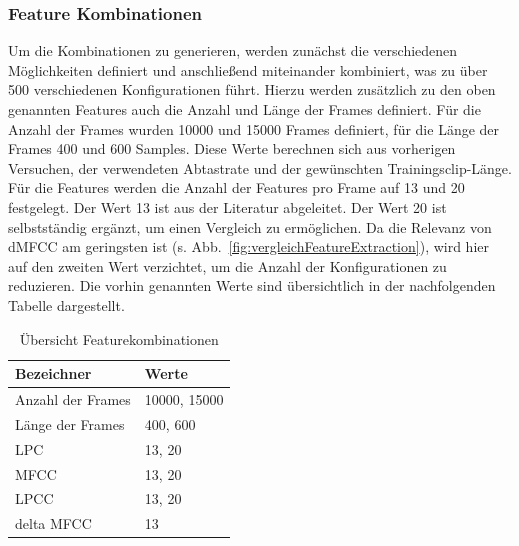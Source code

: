 \subsubsection{Feature Kombinationen}\label{sec:FeatureKombination}

Um die Kombinationen zu generieren, werden zunächst die verschiedenen Möglichkeiten definiert und anschließend miteinander kombiniert, was zu über 500 verschiedenen Konfigurationen führt.
Hierzu werden zusätzlich zu den oben genannten Features auch die Anzahl und Länge der Frames definiert.
Für die Anzahl der Frames wurden 10000 und 15000 Frames definiert, für die Länge der Frames 400 und 600 Samples.
Diese Werte berechnen sich aus vorherigen Versuchen, der verwendeten Abtastrate und der gewünschten Trainingsclip-Länge.
Für die Features werden die Anzahl der Features pro Frame auf 13 und 20 festgelegt.
Der Wert 13 ist aus der Literatur abgeleitet. \autocite[vgl.][S. 69]{valerio_velardo_mel-frequency_2020}
Der Wert 20 ist selbstständig ergänzt, um einen Vergleich zu ermöglichen.
Da die Relevanz von \ac{dMFCC} am geringsten ist (s. Abb.~\ref{fig:vergleichFeatureExtraction}), wird hier auf den zweiten Wert verzichtet, um die Anzahl der Konfigurationen zu reduzieren.
Die vorhin genannten Werte sind übersichtlich in der nachfolgenden Tabelle dargestellt.
\begin{table}[H]
    \centering
    \begin{tabular}{l|l}
        \textbf{Bezeichner} & \textbf{Werte}   \\ \hline
        Anzahl der Frames   & 10000, 15000 \\ \hline
        Länge der Frames    & 400, 600     \\ \hline
        LPC                 & 13, 20       \\ \hline
        MFCC                & 13, 20       \\ \hline
        LPCC                & 13, 20       \\ \hline
        delta MFCC          & 13          
    \end{tabular}
    \caption{Übersicht Featurekombinationen}
\end{table}


